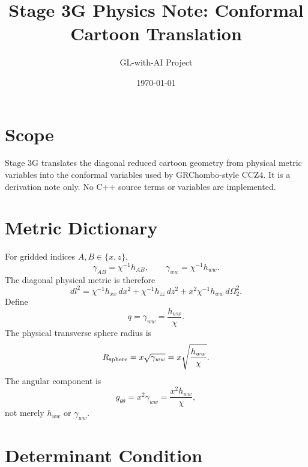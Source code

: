 \documentclass[11pt]{article}
\title{Stage 3G Physics Note: Conformal Cartoon Translation}
\author{GL-with-AI Project}
\date{\today}
\begin{document}
\maketitle

\section{Scope}

Stage 3G translates the diagonal reduced cartoon geometry from physical metric
variables into the conformal variables used by GRChombo-style CCZ4. It is a
derivation note only. No C++ source terms or variables are implemented.

\section{Metric Dictionary}

For gridded indices \(A,B\in\{x,z\}\),
\begin{equation}
  \gamma_{AB}=\chi^{-1}h_{AB},
  \qquad
  \gamma_{ww}=\chi^{-1}h_{ww}.
\end{equation}
The diagonal physical metric is therefore
\begin{equation}
  dl^2
  =
  \chi^{-1}h_{xx}\,dx^2
  +
  \chi^{-1}h_{zz}\,dz^2
  +
  x^2\chi^{-1}h_{ww}\,d\Omega_2^2.
\end{equation}
Define
\begin{equation}
  q=\gamma_{ww}=\frac{h_{ww}}{\chi}.
\end{equation}
The physical transverse sphere radius is
\begin{equation}
  R_{\rm sphere}=x\sqrt{\gamma_{ww}}
  =
  x\sqrt{\frac{h_{ww}}{\chi}}.
\end{equation}
The angular component is
\begin{equation}
  g_{\theta\theta}=x^2\gamma_{ww}
  =
  \frac{x^2h_{ww}}{\chi},
\end{equation}
not merely \(h_{ww}\) or \(\gamma_{ww}\).

\section{Determinant Condition}
\end{document}
